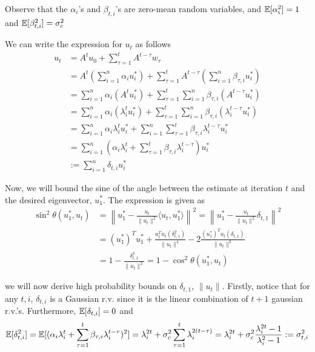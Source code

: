 \documentclass[10pt]{article}
\newcommand{\norm}[1]{\left\|#1\right\|}
\begin{document}
Observe that the $\alpha_i$'s and $\beta_{t,i}$'s are zero-mean random variables, and $\mathbb{E}[\alpha_i^2] = 1$ and $\mathbb{E}[\beta_{t,i}^2] = \sigma_c^2$

We can write the expression for $u_t$ as follows
\begin{align*}
u_t &= A^t u_0 + \sum_{\tau=1}^t A^{t - \tau} w_\tau \\
&= A^t \left( \sum_{i=1}^n \alpha_i u_i^* \right) + \sum_{\tau=1}^t A^{t - \tau} \left( \sum_{i=1}^n \beta_{\tau,i} u_i^* \right) \\
&= \sum_{i=1}^n \alpha_i (A^t u_i^*)  + \sum_{\tau=1}^t \sum_{i=1}^n \beta_{\tau,i} (A^{t - \tau} u_i^*)  \\
&= \sum_{i=1}^n \alpha_i (\lambda_i^t u_i^*)  + \sum_{\tau=1}^t \sum_{i=1}^n \beta_{\tau,i} (\lambda_i^{t - \tau} u_i^*)  \\
&= \sum_{i=1}^n \alpha_i \lambda_i^t u_i^*  + \sum_{i=1}^n \sum_{\tau=1}^t  \beta_{\tau,i} \lambda_i^{t - \tau} u_i^*  \\
&= \sum_{i=1}^n \left(\alpha_i \lambda_i^t + \sum_{\tau=1}^t  \beta_{\tau,i} \lambda_i^{t - \tau}\right) u_i^*  \\
&:= \sum_{i=1}^n \delta_{t,i}  u_i^*
\end{align*}



Now, we will bound the sine of the angle between the estimate at iteration $t$ and the desired eigenvector, $u_1^*$. The expression is given as 
\begin{align*}
\sin^2\theta(u_1^*, u_t) &= \norm{u_1^* - \frac{u_t}{\|u_t\|^2} \langle u_t, u_1^*\rangle}^2 = \norm{u_1^* - \frac{u_t}{\|u_t\|^2} \delta_{t,1}}^2 \\
&= (u_1^*)^Tu_1^* + \frac{u_t^T u_t (\delta_{t,1}^2)}{\|u_t\|^4} - 2 \frac{(u_1^*)^T u_t (\delta_{t,1})}{\|u_t\|^2 } \\
&= 1 - \frac{\delta_{t,1}^2}{\|u_t\|^2} = 1 - \cos^2\theta(u_1^*, u_t)
\end{align*}


we will now derive high probability bounds on $\delta_{t,1}$, $\|u_t\|$. Firstly, notice that for any $t,i$, $\delta_{t,i}$ is a Gaussian r.v. since it is the linear combination of $t+1$ gaussian r.v.'s. Furthermore, $\mathbb{E}[\delta_{t,i}] = 0$ and 
\begin{align*}
\mathbb{E}[\delta_{t,i}^2] = \mathbb{E}[(\alpha_i \lambda_i^t + \sum_{\tau=1}^t \beta_{\tau,i} \lambda_i^{t-\tau})^2] = \lambda_i^{2t} + \sigma_c^2 \sum_{\tau=1}^t \lambda_i^{2(t-\tau)} = \lambda_i^{2t} + \sigma_c^2 \frac{\lambda_i^{2t}-1}{\lambda_i^2-1} := \sigma_{t,i}^2
\end{align*}
\end{document}
